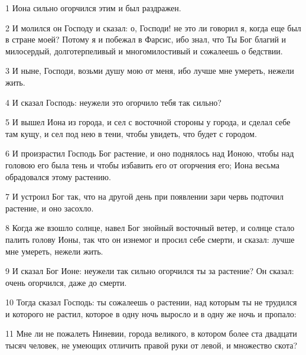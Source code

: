 \par 1 Иона сильно огорчился этим и был раздражен.
\par 2 И молился он Господу и сказал: о, Господи! не это ли говорил я, когда еще был в стране моей? Потому я и побежал в Фарсис, ибо знал, что Ты Бог благий и милосердый, долготерпеливый и многомилостивый и сожалеешь о бедствии.
\par 3 И ныне, Господи, возьми душу мою от меня, ибо лучше мне умереть, нежели жить.
\par 4 И сказал Господь: неужели это огорчило тебя так сильно?
\par 5 И вышел Иона из города, и сел с восточной стороны у города, и сделал себе там кущу, и сел под нею в тени, чтобы увидеть, что будет с городом.
\par 6 И произрастил Господь Бог растение, и оно поднялось над Ионою, чтобы над головою его была тень и чтобы избавить его от огорчения его; Иона весьма обрадовался этому растению.
\par 7 И устроил Бог так, что на другой день при появлении зари червь подточил растение, и оно засохло.
\par 8 Когда же взошло солнце, навел Бог знойный восточный ветер, и солнце стало палить голову Ионы, так что он изнемог и просил себе смерти, и сказал: лучше мне умереть, нежели жить.
\par 9 И сказал Бог Ионе: неужели так сильно огорчился ты за растение? Он сказал: очень огорчился, даже до смерти.
\par 10 Тогда сказал Господь: ты сожалеешь о растении, над которым ты не трудился и которого не растил, которое в одну ночь выросло и в одну же ночь и пропало:
\par 11 Мне ли не пожалеть Ниневии, города великого, в котором более ста двадцати тысяч человек, не умеющих отличить правой руки от левой, и множество скота?


